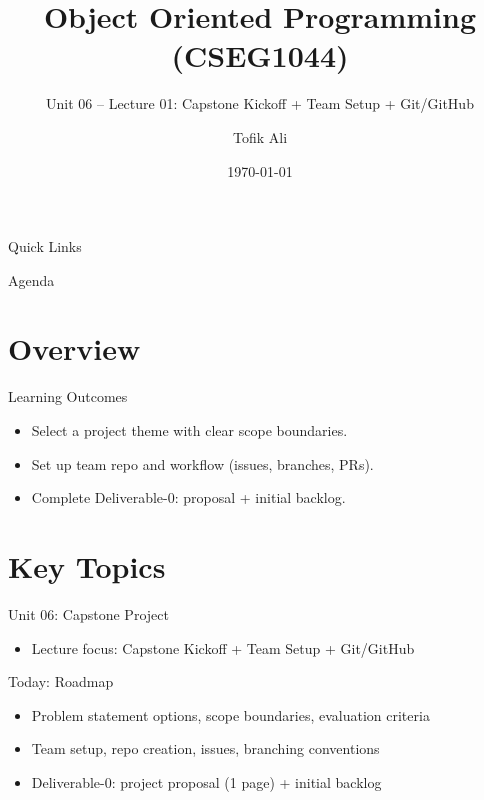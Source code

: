 \documentclass{beamer}
\title[OOPS with Java]{Object Oriented Programming (CSEG1044)}
\subtitle{Unit 06 -- Lecture 01: Capstone Kickoff + Team Setup + Git/GitHub}
\author{Tofik Ali}
\institute{School of Computer Science, UPES Dehradun}
\date{\today}
\begin{document}
\begin{frame}[fragile]
  \titlepage
  \vspace{0.5em}
  \slidesources{\OOPSUnitVISources}
\end{frame}

\begin{frame}{Quick Links}
  \centering
  \hyperlink{sec:overview}{}\hspace{0.6em}
  \hyperlink{sec:concepts}{}\hspace{0.6em}
  \hyperlink{sec:demo}{}\hspace{0.6em}
  \hyperlink{sec:summary}{}
  \slidesources{\OOPSUnitVISources}
\end{frame}

\begin{frame}{Agenda}
  \tableofcontents
  \slidesources{\OOPSUnitVISources}
\end{frame}

\section{Overview}
\label{sec:overview}

\begin{frame}{Learning Outcomes}
  \begin{itemize}[<+->]
    \item Select a project theme with clear scope boundaries.
    \item Set up team repo and workflow (issues, branches, PRs).
    \item Complete Deliverable-0: proposal + initial backlog.
  \end{itemize}
  \slidesources{\OOPSUnitVISources}
\end{frame}

\section{Key Topics}
\label{sec:concepts}

\begin{frame}{Unit 06: Capstone Project}
  \begin{itemize}[<+->]
    \item Lecture focus: Capstone Kickoff + Team Setup + Git/GitHub
  \end{itemize}
  \slidesources{\OOPSUnitVISources}
\end{frame}

\begin{frame}{Today: Roadmap}
  \begin{itemize}[<+->]
    \item Problem statement options, scope boundaries, evaluation criteria
    \item Team setup, repo creation, issues, branching conventions
    \item Deliverable-0: project proposal (1 page) + initial backlog
  \end{itemize}
  \slidesources{\OOPSUnitVISources}
\end{frame}
\end{document}
